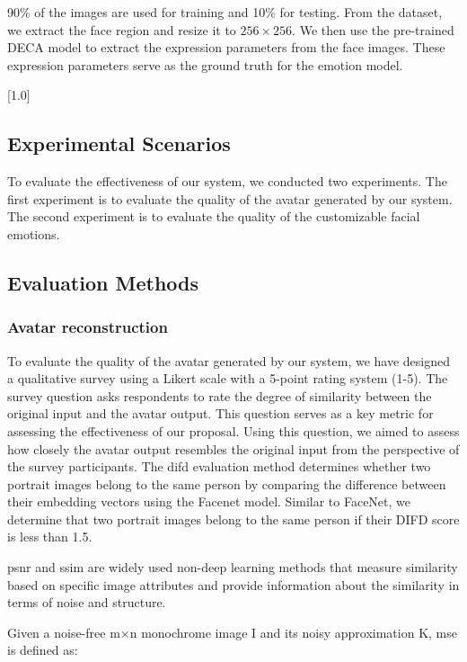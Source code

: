 90\% of the images are used for training and 10\% for testing. From the dataset, we extract the face region and resize it to $256\times256$. We then use the pre-trained DECA model to extract the expression parameters from the face images. These expression parameters serve as the ground truth for the emotion model.

[1.0]

\subsection{Experimental Scenarios}
To evaluate the effectiveness of our system, we conducted two experiments. The first experiment is to evaluate the quality of the avatar generated by our system. The second experiment is to evaluate the quality of the customizable facial emotions.


\subsection{Evaluation Methods}
\subsubsection{Avatar reconstruction}
To evaluate the quality of the avatar generated by our system, we have designed a qualitative survey using a Likert scale with a 5-point rating system (1-5). The survey question asks respondents to rate the degree of similarity between the original input and the avatar output. This question serves as a key metric for assessing the effectiveness of our proposal.
Using this question, we aimed to assess how closely the avatar output resembles the original input from the perspective of the survey participants.
The \acrshort{difd} evaluation method determines whether two portrait images belong to the same person by comparing the difference between their embedding vectors using the Facenet model. Similar to FaceNet, we determine that two portrait images belong to the same person if their DIFD score is less than 1.5.

\acrshort{psnr} and \acrshort{ssim} are widely used non-deep learning methods that measure similarity based on specific image attributes and provide information about the similarity in terms of noise and structure.

Given a noise-free m×n monochrome image I and its noisy approximation K, \acrshort{mse} is defined as:

